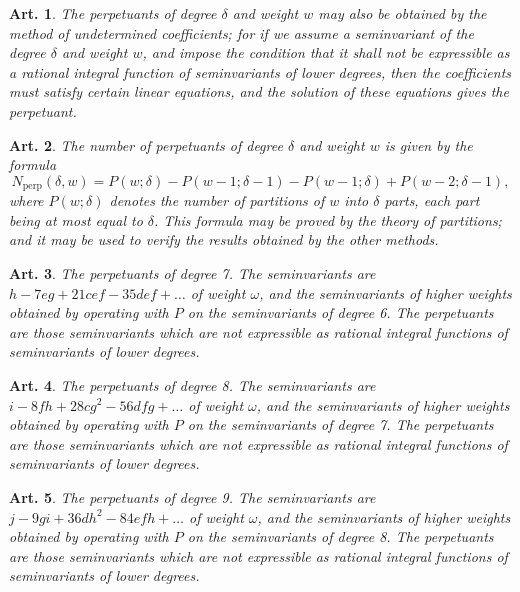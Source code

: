 \documentclass[11pt,a4paper]{article}
\theoremstyle{cayley}
\newtheorem{art}{Art.}[section]
\begin{document}
\setcounter{art}{64}
\begin{art}
The perpetuants of degree $\delta$ and weight $w$ may also be obtained by the method of undetermined coefficients; for if we assume a seminvariant of the degree $\delta$ and weight $w$, and impose the condition that it shall not be expressible as a rational integral function of seminvariants of lower degrees, then the coefficients must satisfy certain linear equations, and the solution of these equations gives the perpetuant.
\end{art}

\setcounter{art}{65}
\begin{art}
The number of perpetuants of degree $\delta$ and weight $w$ is given by the formula
\[
N_{\text{perp}}(\delta, w) = P(w; \delta) - P(w - 1; \delta - 1) - P(w - 1; \delta) + P(w - 2; \delta - 1),
\]
where $P(w; \delta)$ denotes the number of partitions of $w$ into $\delta$ parts, each part being at most equal to $\delta$. This formula may be proved by the theory of partitions; and it may be used to verify the results obtained by the other methods.
\end{art}

\setcounter{art}{66}
\begin{art}
The perpetuants of degree 7. The seminvariants are $h - 7eg + 21cef - 35def + \ldots$ of weight $\omega$, and the seminvariants of higher weights obtained by operating with $P$ on the seminvariants of degree 6. The perpetuants are those seminvariants which are not expressible as rational integral functions of seminvariants of lower degrees.
\end{art}

\setcounter{art}{67}
\begin{art}
The perpetuants of degree 8. The seminvariants are $i - 8fh + 28cg^{2} - 56dfg + \ldots$ of weight $\omega$, and the seminvariants of higher weights obtained by operating with $P$ on the seminvariants of degree 7. The perpetuants are those seminvariants which are not expressible as rational integral functions of seminvariants of lower degrees.
\end{art}

\setcounter{art}{68}
\begin{art}
The perpetuants of degree 9. The seminvariants are $j - 9gi + 36dh^{2} - 84efh + \ldots$ of weight $\omega$, and the seminvariants of higher weights obtained by operating with $P$ on the seminvariants of degree 8. The perpetuants are those seminvariants which are not expressible as rational integral functions of seminvariants of lower degrees.
\end{art}
\end{document}
